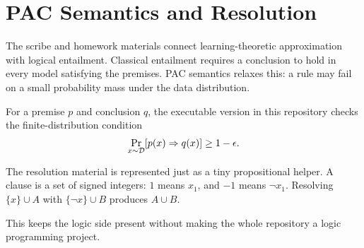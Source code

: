 \section{PAC Semantics and Resolution}

The scribe and homework materials connect learning-theoretic approximation with
logical entailment. Classical entailment requires a conclusion to hold in every
model satisfying the premises. PAC semantics relaxes this: a rule may fail on a
small probability mass under the data distribution.

For a premise $p$ and conclusion $q$, the executable version in this repository
checks the finite-distribution condition
\[
  \Pr_{x \sim \mathcal{D}}[p(x) \Rightarrow q(x)] \geq 1-\epsilon.
\]

The resolution material is represented just as a tiny propositional helper. A
clause is a set of signed integers: $1$ means $x_1$, and $-1$ means $\neg x_1$.
Resolving $\{x\} \cup A$ with $\{\neg x\} \cup B$ produces $A \cup B$.

This keeps the logic side present without making the whole repository a logic
programming project.

